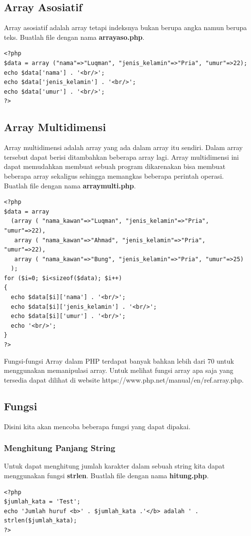 \subsection{Array Asosiatif}
Array asosiatif adalah array tetapi indeksnya bukan berupa angka namun berupa teks. Buatlah file dengan nama \textbf{arrayaso.php}.
\begin{lstlisting}
<?php
$data = array ("nama"=>"Luqman", "jenis_kelamin"=>"Pria", "umur"=>22);
echo $data['nama'] . '<br/>';
echo $data['jenis_kelamin'] . '<br/>';
echo $data['umur'] . '<br/>';
?>
\end{lstlisting}

\subsection{Array Multidimensi}
Array multidimensi adalah array yang ada dalam array itu sendiri. Dalam array tersebut dapat berisi ditambahkan beberapa array lagi. Array multidimensi ini dapat memudahkan membuat sebuah program dikarenakan bisa membuat beberapa array sekaligus sehingga memangkas beberapa perintah operasi.
Buatlah file dengan nama \textbf{arraymulti.php}.
\begin{lstlisting}
<?php
$data = array
  (array ( "nama_kawan"=>"Luqman", "jenis_kelamin"=>"Pria", "umur"=>22),
   array ( "nama_kawan"=>"Ahmad", "jenis_kelamin"=>"Pria", "umur"=>22),
   array ( "nama_kawan"=>"Bung", "jenis_kelamin"=>"Pria", "umur"=>25)
  );
for ($i=0; $i<sizeof($data); $i++)
{
  echo $data[$i]['nama'] . '<br/>';
  echo $data[$i]['jenis_kelamin'] . '<br/>';
  echo $data[$i]['umur'] . '<br/>';
  echo '<br/>';
}
?>
\end{lstlisting} 
Fungsi-fungsi Array dalam PHP terdapat banyak bahkan lebih dari 70 untuk menggunakan memanipulasi array. Untuk melihat fungsi array apa saja yang tersedia dapat dilihat di website https://www.php.net/manual/en/ref.array.php.

\subsection{Fungsi}
Disini kita akan mencoba beberapa fungsi yang dapat dipakai.
\subsubsection{Menghitung Panjang String}
Untuk dapat menghitung jumlah karakter dalam sebuah string kita dapat menggunakan fungsi \textbf{strlen}. Buatlah file dengan nama \textbf{hitung.php}.
\begin{lstlisting}
<?php
$jumlah_kata = 'Test';
echo 'Jumlah huruf <b>' . $jumlah_kata .'</b> adalah ' . strlen($jumlah_kata);
?>
\end{lstlisting}

